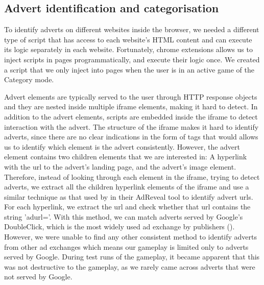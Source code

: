 \documentclass{l4proj}
\begin{document}
\subsection{Advert identification and categorisation}
To identify adverts on different websites inside the browser, we needed a different type of script that has access to each website's HTML content and can execute its logic separately in each website. Fortunately, chrome extensions allows us to inject scripts in pages programmatically, and execute their logic once. We created a script that we only inject into pages when the user is in an active game of the Category mode. 

Advert elements are typically served to the user through HTTP response objects and they are nested inside multiple iframe elements, making it hard to detect. In addition to the advert elements, scripts are embedded inside the iframe to detect interaction with the advert. The structure of the iframe makes it hard to identify adverts, since there are no clear indications in the form of tags that would allows us to identify which element is the advert consistently. However, the advert element contains two children elements that we are interested in: A hyperlink with the url to the advert's landing page, and the advert's image element. Therefore, instead of looking through each element in the iframe, trying to detect adverts, we extract all the children hyperlink elements of the iframe and use a similar technique as that used by \cite{Liu2013} in their AdReveal tool to identify advert urls. For each hyperlink, we extract the url and check whether that url contains the string 'adurl='. With this method, we can match adverts served by Google's DoubleClick, which is the most widely used ad exchange by publishers (\cite{dclick}). However, we were unable to find any other consistent method to identify adverts from other ad exchanges which means our gameplay is limited only to adverts served by Google. During test runs of the gameplay, it became apparent that this was not destructive to the gameplay, as we rarely came across adverts that were not served by Google.

\end{document}
